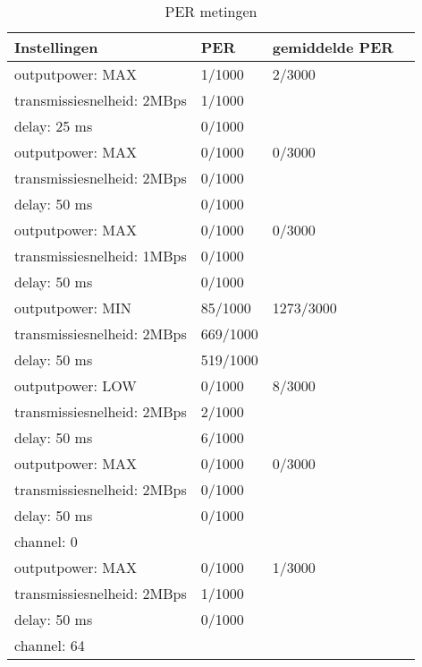 \documentclass{article}
\begin{document}
\begin{table}[h]
\centering \caption{PER metingen}
\label{table:interferentieloos}
    \begin{tabular}{ | l | l | l | p{5cm} |}
    \hline
    Instellingen 				& PER 		& gemiddelde PER\\ \hline
    outputpower: MAX 			& 1/1000 	& 2/3000		\\
    transmissiesnelheid: 2MBps 	& 1/1000 	& 				\\
    delay: 25 ms 				& 0/1000	&  				\\ \hline

    outputpower: MAX 			& 0/1000 	& 0/3000		\\
    transmissiesnelheid: 2MBps 	& 0/1000 	&  				\\
    delay: 50 ms 				& 0/1000	&  				\\ \hline
   
    outputpower: MAX 			& 0/1000 	& 0/3000		\\
    transmissiesnelheid: 1MBps 	& 0/1000 	&  				\\
    delay: 50 ms 				& 0/1000	&  				\\ \hline
   
    outputpower: MIN 			& 85/1000 	& 1273/3000		\\ 
    transmissiesnelheid: 2MBps 	& 669/1000  &  				\\ 
    delay: 50 ms 				& 519/1000 	&  				\\ \hline
   
    outputpower: LOW 			& 0/1000 	& 8/3000		\\ 
    transmissiesnelheid: 2MBps 	& 2/1000 	&   			\\ 
    delay: 50 ms 				& 6/1000 	&  				\\ \hline
 
    outputpower: MAX 			& 0/1000 	&  0/3000		\\ 
    transmissiesnelheid: 2MBps 	& 0/1000 	&   			\\ 
    delay: 50 ms 				& 0/1000 	&				\\ 
    channel: 0 					&  			&  				\\ \hline
  
    outputpower: MAX 			& 0/1000 	& 1/3000		\\ 
    transmissiesnelheid: 2MBps 	& 1/1000 	&  				\\ 
    delay: 50 ms 				& 0/1000 	&  				\\ 
    channel: 64 				&  			&				\\ \hline
\end{tabular}
\end{table}
    
\end{document}

